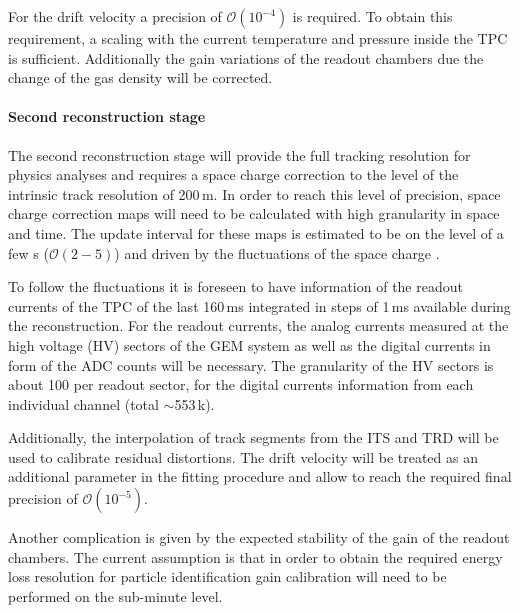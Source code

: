 For the drift velocity a precision of $\mathcal{O}(10^{-4})$ is
required.
To obtain this requirement, a scaling with the current temperature and
pressure inside the TPC is sufficient.
Additionally the gain variations of the readout chambers due the change
of the gas density will be corrected.


\paragraph{Second reconstruction stage}
The second reconstruction stage will provide the full tracking
resolution for physics analyses and requires a space charge correction
to the level of the intrinsic track resolution of
200\,\textmu m.
In order to reach this level of precision, space charge correction maps
will need to be calculated with high granularity in space and time.
The update interval for these maps is estimated to be on the level of a
few \textmu s ($\mathcal{O}(2-5)$) and driven by the
fluctuations of the space charge \cite{TPCTDR}.

To follow the fluctuations it is foreseen to have information of the
readout currents of the TPC of the last 160\,ms integrated in
steps of 1\,ms available during the reconstruction.
For the readout currents, the analog currents measured at the high
voltage (HV) sectors of the GEM system as well as the digital currents
in form of the ADC counts will be necessary.
The granularity of the HV sectors is about 100 per readout sector, for
the digital currents information from each individual channel (total
$\sim$553\,k).

Additionally, the interpolation of track segments from the ITS and TRD
will be used to calibrate residual distortions.
The drift velocity will be treated as an additional parameter in the
fitting procedure and allow to reach the required final precision of
$\mathcal{O}(10^{-5})$.

Another complication is given by the expected stability of the gain of
the readout chambers.
The current assumption is that in order to obtain the required energy
loss resolution for particle identification gain calibration will need
to be performed on the sub-minute level.

